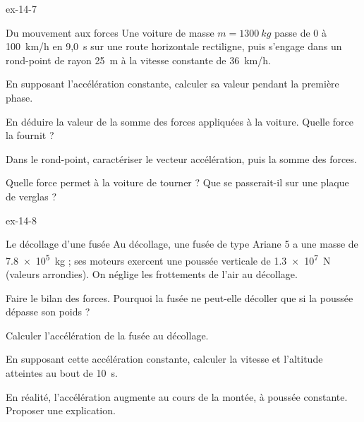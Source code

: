 \begin{blocLivre}{ex-14-7}
\begin{exercice}[2]{Du mouvement aux forces}
Une voiture de masse $m=\qty{1300}{kg}$ passe de 0 à 100~km/h en 9,0~s sur une route horizontale rectiligne, puis
s'engage dans un rond-point de rayon \qty{25}{m} à la vitesse constante de 36~km/h.
\begin{questions}
\item En supposant l'accélération constante, calculer sa valeur pendant la première phase.
\item En déduire la valeur de la somme des forces appliquées à la voiture. Quelle force la fournit ?
\item Dans le rond-point, caractériser le vecteur accélération, puis la somme des forces.
\item Quelle force permet à la voiture de tourner ? Que se passerait-il sur une plaque de verglas ?
\end{questions}
\end{exercice}
\end{blocLivre}
\begin{blocLivre}{ex-14-8}
\begin{exercice}[2]{Le décollage d'une fusée}
Au décollage, une fusée de type Ariane 5 a une masse de \qty{7,8e5}{kg} ; ses moteurs exercent une poussée verticale de
\qty{1,3e7}{N} (valeurs arrondies). On néglige les frottements de l'air au décollage.
\begin{questions}
\item Faire le bilan des forces. Pourquoi la fusée ne peut-elle décoller que si la poussée dépasse son poids ?
\item Calculer l'accélération de la fusée au décollage.
\item En supposant cette accélération constante, calculer la vitesse et l'altitude atteintes au bout de 10~s.
\item En réalité, l'accélération augmente au cours de la montée, à poussée constante. Proposer une explication.
\end{questions}
\end{exercice}
\end{blocLivre}
